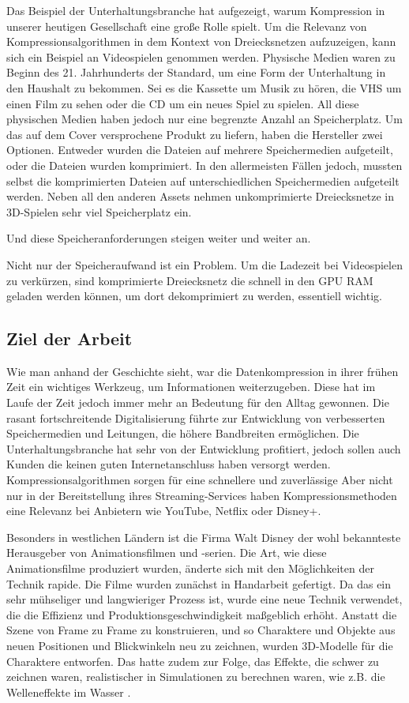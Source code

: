 Das Beispiel der Unterhaltungsbranche hat aufgezeigt, warum Kompression in unserer heutigen Gesellschaft eine große Rolle spielt.
Um die Relevanz von Kompressionsalgorithmen in dem Kontext von Dreiecksnetzen aufzuzeigen, kann sich ein Beispiel an Videospielen genommen werden.
Physische Medien waren zu Beginn des 21. Jahrhunderts der Standard, um eine Form der Unterhaltung in den Haushalt zu bekommen.
Sei es die Kassette um Musik zu hören, die VHS um einen Film zu sehen oder die CD um ein neues Spiel zu spielen.
All diese physischen Medien haben jedoch nur eine begrenzte Anzahl an Speicherplatz.
Um das auf dem Cover versprochene Produkt zu liefern, haben die Hersteller zwei Optionen.
Entweder wurden die Dateien auf mehrere Speichermedien aufgeteilt, oder die Dateien wurden komprimiert.
In den allermeisten Fällen jedoch, mussten selbst die komprimierten Dateien auf unterschiedlichen Speichermedien aufgeteilt werden.
Neben all den anderen Assets nehmen unkomprimierte Dreiecksnetze in 3D-Spielen sehr viel Speicherplatz ein.

Und diese Speicheranforderungen steigen weiter und weiter an.

Nicht nur der Speicheraufwand ist ein Problem.
Um die Ladezeit bei Videospielen zu verkürzen, sind komprimierte Dreiecksnetz die schnell in den GPU RAM geladen werden können, um dort dekomprimiert zu werden, essentiell wichtig.

\subsection{Ziel der Arbeit}
Wie man anhand der Geschichte sieht, war die Datenkompression in ihrer frühen Zeit ein wichtiges Werkzeug, um Informationen weiterzugeben.
Diese hat im Laufe der Zeit jedoch immer mehr an Bedeutung für den Alltag gewonnen.
Die rasant fortschreitende Digitalisierung führte zur Entwicklung von verbesserten Speichermedien und Leitungen, die höhere Bandbreiten ermöglichen.
Die Unterhaltungsbranche hat sehr von der Entwicklung profitiert, jedoch sollen auch Kunden die keinen guten Internetanschluss haben versorgt werden.
Kompressionsalgorithmen sorgen für eine schnellere und zuverlässige 
Aber nicht nur in der Bereitstellung ihres Streaming-Services haben Kompressionsmethoden eine Relevanz bei Anbietern wie YouTube, Netflix oder Disney+. \newline

Besonders in westlichen Ländern ist die Firma Walt Disney der wohl bekannteste Herausgeber von Animationsfilmen und -serien.
Die Art, wie diese Animationsfilme produziert wurden, änderte sich mit den Möglichkeiten der Technik rapide.
Die Filme wurden zunächst in Handarbeit gefertigt.
Da das ein sehr mühseliger und langwieriger Prozess ist, wurde eine neue Technik verwendet, die die Effizienz und Produktionsgeschwindigkeit maßgeblich erhöht.
Anstatt die Szene von Frame zu Frame zu konstruieren, und so Charaktere und Objekte aus neuen Positionen und Blickwinkeln neu zu zeichnen, wurden 3D-Modelle für die Charaktere entworfen.
Das hatte zudem zur Folge, das Effekte, die schwer zu zeichnen waren, realistischer in Simulationen zu berechnen waren, wie z.B. die Welleneffekte im Wasser \cite{Disney2021}. \newline

